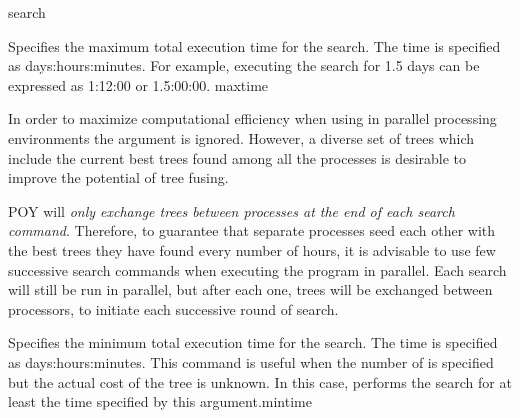 \begin{command}{search}{}
\begin{arguments}
{Specifies the maximum total execution time for the search. The time is specified as
days:hours:minutes. For example, executing the search for 1.5 days can
be expressed as 1:12:00 or 1.5:00:00.}
{maxtime}



\begin{statement}
\setlength{\parindent}{0.5cm}
In order to maximize computational efficiency when using  
in parallel processing environments the 
argument is ignored. However, a diverse set of trees which
include the current best trees found among all the processes is
desirable to improve the potential of tree fusing.

\indent POY will \emph{only exchange trees between processes at the end
of each search command}. Therefore,
to guarantee that separate processes seed each other with the
best trees they have found every number of hours,
it is advisable to use few successive search commands
when executing the program in parallel. Each search will still
be run in parallel, but after each one, trees will be exchanged
between processors, to initiate each successive round of search.
\end{statement}

{Specifies the minimum total execution time for the search. The time is specified as
days:hours:minutes. This command is useful when
the number of  is specified but the actual cost of the
tree is unknown. In this case, \poy performs the search for at least the time
specified by this argument.}{mintime}


\end{arguments}
\end{command}
